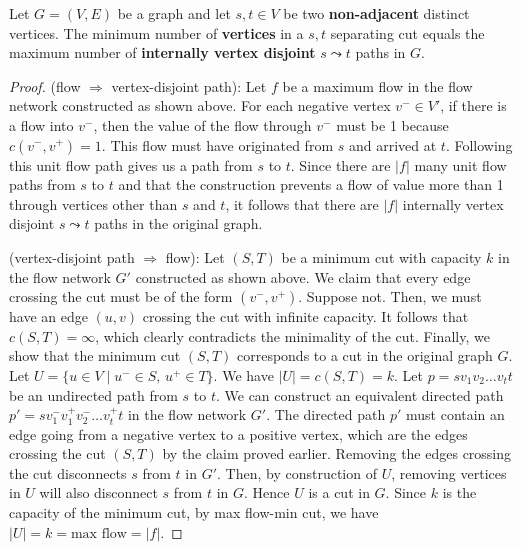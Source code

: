 \begin{theorem} 
    Let $G=(V,E)$ be a graph and let $s,t \in V$ be two \textbf{non-adjacent} distinct vertices. The minimum number of \textbf{vertices} in a $s,t$ separating cut equals the maximum number of \textbf{internally vertex disjoint} $s \leadsto t$ paths in $G$.
\end{theorem}

\begin{proof}
    \hfill

    (flow $\Rightarrow$ vertex-disjoint path): Let $f$ be a maximum flow in the flow network constructed as shown above. For each negative vertex $v^- \in V'$, if there is a flow into $v^-$, then the value of the flow through $v^-$ must be 1 because $c(v^-,v^+)=1$. This flow must have originated from $s$ and arrived at $t$. Following this unit flow path gives us a path from $s$ to $t$. Since there are $|f|$ many unit flow paths from $s$ to $t$ and that the construction prevents a flow of value more than 1 through vertices other than $s$ and $t$, it follows that there are $|f|$ internally vertex disjoint $s \leadsto t$ paths in the original graph.

    (vertex-disjoint path $\Rightarrow$ flow): Let $(S,T)$ be a minimum cut with capacity $k$ in the flow network $G'$ constructed as shown above. We claim that every edge crossing the cut must be of the form $(v^-,v^+)$. Suppose not. Then, we must have an edge $(u,v)$ crossing the cut with infinite capacity. It follows that $c(S,T) = \infty$, which clearly contradicts the minimality of the cut. Finally, we show that the minimum cut $(S,T)$ corresponds to a cut in the original graph $G$. Let $U = \{u \in V \mid u^- \in S,\, u^+ \in T\}$. We have $|U| = c(S,T) = k$. Let $p = sv_1v_2\ldots v_t t$ be an undirected path from $s$ to $t$. We can construct an equivalent directed path $p' = s v_1^- v_1^+ v_2^- \ldots v_t^+ t$ in the flow network $G'$. The directed path $p'$ must contain an edge going from a negative vertex to a positive vertex, which are the edges crossing the cut $(S,T)$ by the claim proved earlier. Removing the edges crossing the cut disconnects $s$ from $t$ in $G'$. Then, by construction of $U$, removing vertices in $U$ will also disconnect $s$ from $t$ in $G$. Hence $U$ is a cut in $G$. Since $k$ is the capacity of the minimum cut, by max flow-min cut, we have $|U| = k = \text{max flow} = |f|$.
\end{proof}


